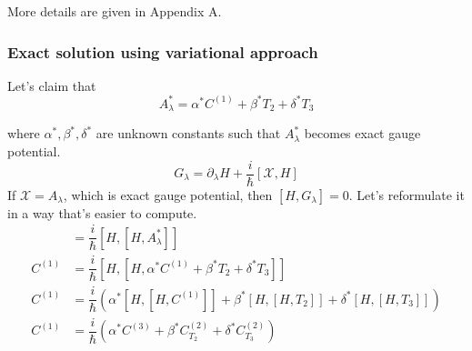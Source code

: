 \documentclass[11pt,a4paper]{article}
\begin{document}
More details are given in Appendix A.
%
%
%
%
%
\subsubsection{Exact solution using variational approach}


Let's claim that 
\begin{equation}
 A_{\lambda}^*= \alpha^* C^{(1)} +  \beta^* T_2 + \delta^* T_3 
\end{equation}

where $\alpha^*, \beta^*, \delta^* $ are unknown constants such that $A_{\lambda}^*$ becomes exact gauge potential.
\begin{equation}
G_{\lambda}= \partial_{\lambda} H + \dfrac{i}{\hbar} [\mathcal{X}, H] 
\end{equation}
If $\mathcal{X}= A_{\lambda}$, which is exact gauge potential, then $[H,G_{\lambda}]=0 $. Let's reformulate it in a way that's easier to compute. 
\begin{align}
[H,\partial_{\lambda} H ] &= \dfrac{i}{\hbar} [H,[H, A_{\lambda}^*]] \\
C^{(1)} &= \dfrac{i}{\hbar} [H,[H,\alpha^* C^{(1)} +  \beta^* T_2 + \delta^* T_3 ]] \\
C^{(1)} &= \dfrac{i}{\hbar} \left (\alpha^* [H,[H, C^{(1)}]]  +  \beta^* [H,[H,  T_2 ]]+  \delta^* [H,[H,  T_3]]  \right)  \\
C^{(1)} &= \dfrac{i}{\hbar} \left (\alpha^* C^{(3)}   + \beta^*   C^{(2)}_{T_2} + \delta^* C^{(2)}_{T_3} \right)
\end{align}
\end{document}
